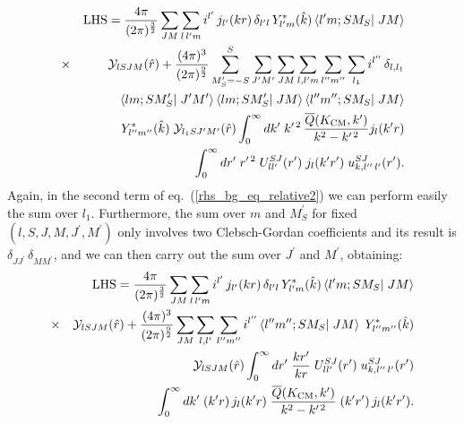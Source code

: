 \documentclass[aps,twocolumn,showpacs,preprintnumbers,amsmath,amssymb,nofootinbib,superscriptaddress,showkeys,noeprint]{revtex4-1}
\begin{document}
\begin{eqnarray}
  &&{\rm LHS}=\frac{4\pi}{(2\pi)^\frac32}
 \sum_{JM}\sum_{l\,l^\prime m}
 i^{l^\prime}\,
 j_{l^\prime}(kr)\,
 \delta_{l^\prime l}\,
 Y^*_{l^\prime m}(\hat{k}) \left\langle
 l^\prime m;SM_S\right|
 \left. JM\right\rangle
 \nonumber\\
&\times& \mathcal{Y}_{lSJM}(\hat{r})+
\frac{(4\pi)^3}{(2\pi)^\frac92}
\sum^{S}_{M^\prime_S=-S}
\sum_{J^\prime M^\prime}
\sum_{JM}
\sum_{l,l^\prime m}
\sum_{l^{\prime\prime}m^{\prime\prime}}
\sum_{l_1}
i^{l^{\prime\prime}}\,
\delta_{l, l_1}
\nonumber\\
&&\left\langle 
lm;S M^\prime_S
\right|\left. J^\prime
M^\prime\right\rangle
\left\langle
lm;SM^\prime_S\right|
\left. JM\right\rangle
\left\langle l^{\prime\prime}m^{\prime\prime};SM_S
\right|\left. JM
\right\rangle
\nonumber\\
&&Y^*_{l^{\prime\prime}m^{\prime\prime}}(\hat{k})\;
\mathcal{Y}_{l_1 S J^\prime M^\prime}(\hat{r})
\int^\infty_0
dk^\prime\;
k^{\prime\,2}\,
\frac{\overline{Q}(K_{\rm CM},k^\prime)}{k^2-k^{\prime\,2}}
j_{l}(k^\prime r)
\nonumber\\
&&\int^\infty_0 dr^\prime\; 
r^{\prime\,2}\;
U^{SJ}_{l l^\prime}(r^\prime)\;
j_l(k^\prime
r^\prime)\;u^{SJ}_{k,l^{\prime\prime}\,l^\prime}(r^\prime).\label{rhs_bg_eq_relative2}
\end{eqnarray}
Again, in the second term of eq.~(\ref{rhs_bg_eq_relative2}) we can
perform easily the sum over $l_1$. Furthermore, the sum over $m$ and
$M^\prime_S$ for fixed $(l,S,J,M,J^\prime,M^\prime)$ only involves two
Clebsch-Gordan coefficients and its result is
$\delta_{JJ^\prime}\,\delta_{MM^\prime}$, and we can then carry out
the sum over $J^\prime$ and $M^\prime$, obtaining:
\begin{eqnarray}
  &&{\rm LHS}=\frac{4\pi}{(2\pi)^\frac32}
 \sum_{JM}\sum_{l\,l^\prime m}
 i^{l^\prime}\,
 j_{l^\prime}(kr)\,
 \delta_{l^\prime l}\,
 Y^*_{l^\prime m}(\hat{k}) \left\langle
 l^\prime m;SM_S\right|
 \left. JM\right\rangle
 \nonumber\\
&\times& \mathcal{Y}_{lSJM}(\hat{r})+
\frac{(4\pi)^3}{(2\pi)^\frac92}
\sum_{JM}
\sum_{l,l^\prime}
\sum_{l^{\prime\prime}m^{\prime\prime}}
i^{l^{\prime\prime}}
\left\langle l^{\prime\prime}m^{\prime\prime};SM_S
\right|\left. JM
\right\rangle\;
Y^*_{l^{\prime\prime}m^{\prime\prime}}(\hat{k})\nonumber\\
&&\mathcal{Y}_{l S J M}(\hat{r})
\int^\infty_0 dr^\prime\; 
\frac{kr^{\prime}}{kr}\;
U^{SJ}_{l l^\prime}(r^\prime)\;
u^{SJ}_{k,l^{\prime\prime}\,l^\prime}(r^\prime)
\nonumber\\
&&\int^\infty_0 dk^\prime\;
(k^{\prime}r)\,j_{l}(k^\prime r)\;
\frac{\overline{Q}(K_{\rm CM},k^\prime)}{k^2-k^{\prime\,2}}\;
(k^\prime r^\prime)\,j_l(k^\prime
r^\prime).\label{rhs_bg_eq_relative3} 
\end{eqnarray}
\end{document}
